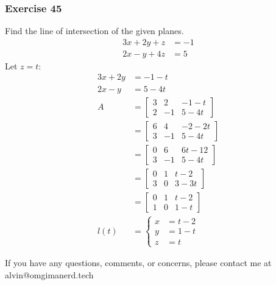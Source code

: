 \documentclass{math}
\begin{document}
\subsubsection*{Exercise 45}
Find the line of intersection of the given planes.
\begin{align*}
  3x+2y+z &= -1 \\
  2x-y+4z &= 5
\end{align*}
Let \( z = t \):
\begin{align*}
  3x+2y &= -1-t \\
  2x-y &= 5-4t \\
  A &= \begin{bmatrix}
    3 & 2 & -1-t \\
    2 & -1 & 5-4t
  \end{bmatrix} \\
  &= \begin{bmatrix}
    6 & 4 & -2-2t \\
    3 & -1 & 5-4t
  \end{bmatrix} \\
  &= \begin{bmatrix}
    0 & 6 & 6t-12 \\
    3 & -1 & 5-4t
  \end{bmatrix} \\
  &= \begin{bmatrix}
    0 & 1 & t-2 \\
    3 & 0 & 3-3t
  \end{bmatrix} \\
  &= \begin{bmatrix}
    0 & 1 & t-2 \\
    1 & 0 & 1-t
  \end{bmatrix} \\
  l(t) &= \begin{cases}
    x &= t-2 \\
    y &= 1-t \\
    z &= t
  \end{cases}
\end{align*}

\begin{center}
  If you have any questions, comments, or concerns, please contact me at
  alvin@omgimanerd.tech
\end{center}
\end{document}
